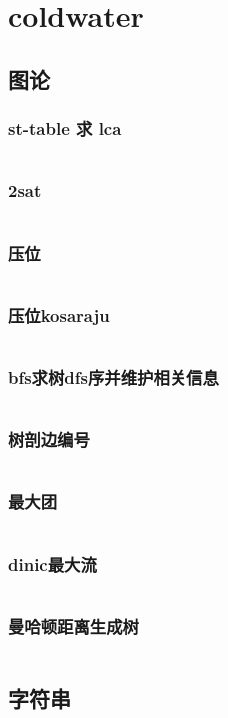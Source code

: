 \chapter{coldwater}
\section{图论}
\subsection{st-table 求 lca}
\inputminted{cpp}{\source/coldwater/graph/st-table-lca.cpp}
\subsection{2sat}
\inputminted{cpp}{\source/coldwater/graph/2sat.cpp}
\subsection{压位}
\inputminted{cpp}{\source/coldwater/graph/bitset.cpp}
\subsection{压位kosaraju}
\inputminted{cpp}{\source/coldwater/graph/kosaraju.cpp}
\subsection{bfs求树dfs序并维护相关信息}
\inputminted{cpp}{\source/coldwater/graph/bfs-dfs-tree.cpp}
\subsection{树剖边编号}
\inputminted{cpp}{\source/coldwater/graph/tree-decom-edge.cpp}
\subsection{最大团}
\inputminted{cpp}{\source/coldwater/graph/max_clique.cpp}
\subsection{dinic最大流}
\inputminted{cpp}{\source/coldwater/graph/dinic.cpp}
\subsection{曼哈顿距离生成树}
\inputminted{cpp}{\source/coldwater/graph/manhattan-st.cpp}
\section{字符串}
